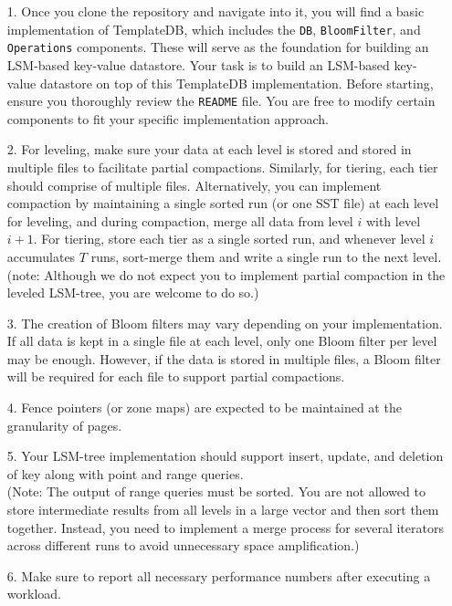 \documentclass[12pt,a4paper,twoside]{article}
\begin{document}
\begin{enumerate}
    \item[1.] Once you clone the repository and navigate into it, you will find a basic implementation of TemplateDB, which includes the \texttt{DB}, \texttt{BloomFilter}, and \texttt{Operations} components.
    These will serve as the foundation for building an LSM-based key-value datastore.
    Your task is to build an LSM-based key-value datastore on top of this TemplateDB implementation. Before starting, ensure you thoroughly review the \texttt{README} file.
    You are free to modify certain components to fit your specific implementation approach.
    \item[2.] For leveling, make sure your data at each level is stored and stored in multiple files to facilitate partial compactions.
    Similarly, for tiering, each tier should comprise of multiple files.
    Alternatively, you can implement compaction by maintaining a single sorted run (or one SST file) at each level for leveling, and during compaction, merge all data from level $i$ with level $i+1$. 
    For tiering, store each tier as a single sorted run, and whenever level $i$ accumulates $T$ runs, sort-merge them and write a single run to the next level. \\
    (note: Although we do not expect you to implement partial compaction in the leveled LSM-tree, you are welcome to do so.)
    \item[3. ] The creation of Bloom filters may vary depending on your implementation. If all data is kept in a single file at each level, only one Bloom filter per level may be enough.
    However, if the data is stored in multiple files, a Bloom filter will be required for each file to support partial compactions.
    \item[4. ] Fence pointers (or zone maps) are expected to be maintained at the granularity of pages. 
    \item[5. ] Your LSM-tree implementation should support insert, update, and deletion of key along with point and range queries. \\
    (Note: The output of range queries must be sorted. You are not allowed to store intermediate results from all levels in a large vector and then sort them together. Instead, you need to implement a merge process for several iterators across different runs to avoid unnecessary space amplification.)
    \item[6. ] Make sure to report all necessary performance numbers after executing a workload. 
\end{enumerate}
\end{document}
